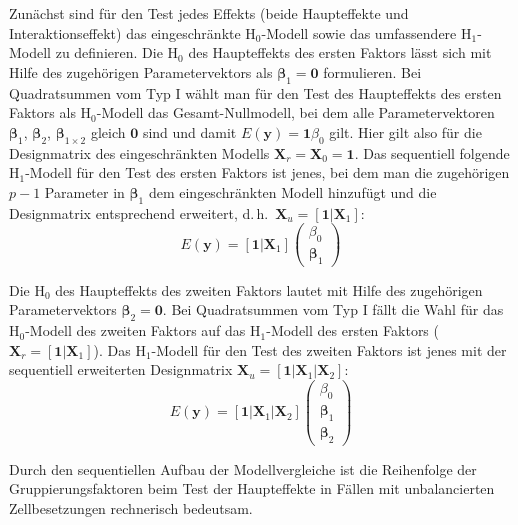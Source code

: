 Zunächst sind für den Test jedes Effekts (beide Haupteffekte und Interaktionseffekt) das eingeschränkte $\text{H}_{0}$-Modell sowie das umfassendere $\text{H}_{1}$-Modell zu definieren. Die $\text{H}_{0}$ des Haupteffekts des ersten Faktors lässt sich mit Hilfe des zugehörigen Parametervektors als $\bm{\beta}_{1} = \bm{0}$ formulieren. Bei Quadratsummen vom Typ I wählt man für den Test des Haupteffekts des ersten Faktors als $\text{H}_{0}$-Modell das Gesamt-Nullmodell, bei dem alle Parametervektoren $\bm{\beta}_{1}$, $\bm{\beta}_{2}$, $\bm{\beta}_{1 \times 2}$ gleich $\bm{0}$ sind und damit $E(\bm{y}) = \bm{1} \beta_{0}$ gilt. Hier gilt also für die Designmatrix des eingeschränkten Modells $\bm{X}_{r} = \bm{X}_{0} = \bm{1}$. Das sequentiell folgende $\text{H}_{1}$-Modell für den Test des ersten Faktors ist jenes, bei dem man die zugehörigen $p-1$ Parameter in $\bm{\beta}_{1}$ dem eingeschränkten Modell hinzufügt und die Designmatrix entsprechend erweitert, d.\,h.\ $\bm{X}_{u} = [\bm{1} | \bm{X}_{1}]$:
\begin{equation*}
E(\bm{y}) = [\bm{1} | \bm{X}_{1}] \left(\begin{array}{c} \beta_{0} \\ \bm{\beta}_{1} \end{array}\right)
\end{equation*}

Die $\text{H}_{0}$ des Haupteffekts des zweiten Faktors lautet mit Hilfe des zugehörigen Parametervektors $\bm{\beta}_{2} = \bm{0}$. Bei Quadratsummen vom Typ I fällt die Wahl für das $\text{H}_{0}$-Modell des zweiten Faktors auf das $\text{H}_{1}$-Modell des ersten Faktors ($\bm{X}_{r} = [\bm{1} | \bm{X}_{1}]$). Das $\text{H}_{1}$-Modell für den Test des zweiten Faktors ist jenes mit der sequentiell erweiterten Designmatrix $\bm{X}_{u} = [\bm{1} | \bm{X}_{1} | \bm{X}_{2}]$:
\begin{equation*}
E(\bm{y}) = [\bm{1} | \bm{X}_{1} | \bm{X}_{2}] \left(\begin{array}{c} \beta_{0} \\ \bm{\beta}_{1} \\ \bm{\beta}_{2}\end{array}\right)
\end{equation*}

Durch den sequentiellen Aufbau der Modellvergleiche ist die Reihenfolge der Gruppierungsfaktoren beim Test der Haupteffekte in Fällen mit unbalancierten Zellbesetzungen rechnerisch bedeutsam.

